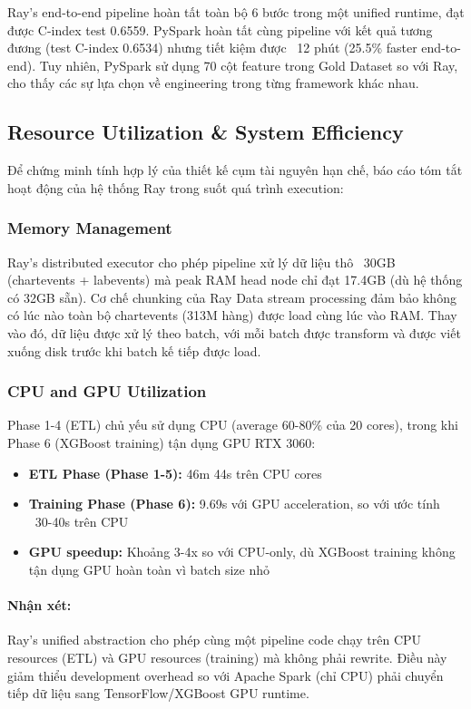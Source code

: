 Ray's end-to-end pipeline hoàn tất toàn bộ 6 bước trong một unified runtime, đạt được C-index test 0.6559. PySpark hoàn tất cùng pipeline với kết quả tương đương (test C-index 0.6534) nhưng tiết kiệm được ~12 phút (25.5\% faster end-to-end). Tuy nhiên, PySpark sử dụng 70 cột feature trong Gold Dataset so với Ray, cho thấy các sự lựa chọn về engineering trong từng framework khác nhau.

\subsection{Resource Utilization \& System Efficiency}

Để chứng minh tính hợp lý của thiết kế cụm tài nguyên hạn chế, báo cáo tóm tắt hoạt động của hệ thống Ray trong suốt quá trình execution:

\subsubsection{Memory Management}

Ray's distributed executor cho phép pipeline xử lý dữ liệu thô ~30GB (chartevents + labevents) mà peak RAM head node chỉ đạt 17.4GB (dù hệ thống có 32GB sẵn). Cơ chế chunking của Ray Data stream processing đảm bảo không có lúc nào toàn bộ chartevents (313M hàng) được load cùng lúc vào RAM. Thay vào đó, dữ liệu được xử lý theo batch, với mỗi batch được transform và được viết xuống disk trước khi batch kế tiếp được load.

\subsubsection{CPU and GPU Utilization}

Phase 1-4 (ETL) chủ yếu sử dụng CPU (average 60-80\% của 20 cores), trong khi Phase 6 (XGBoost training) tận dụng GPU RTX 3060:
\begin{itemize}
    \item \textbf{ETL Phase (Phase 1-5):} 46m 44s trên CPU cores
    \item \textbf{Training Phase (Phase 6):} 9.69s với GPU acceleration, so với ước tính ~30-40s trên CPU
    \item \textbf{GPU speedup:} Khoảng 3-4x so với CPU-only, dù XGBoost training không tận dụng GPU hoàn toàn vì batch size nhỏ
\end{itemize}

\paragraph{Nhận xét:} Ray's unified abstraction cho phép cùng một pipeline code chạy trên CPU resources (ETL) và GPU resources (training) mà không phải rewrite. Điều này giảm thiểu development overhead so với Apache Spark (chỉ CPU) phải chuyển tiếp dữ liệu sang TensorFlow/XGBoost GPU runtime.

